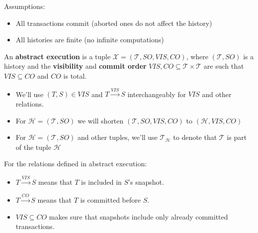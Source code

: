 \documentclass{beamer}
\begin{document}
\begin{frame}
	Assumptions:
	\begin{itemize}
		\item All transactions commit (aborted ones do not affect the history)
		\item All histories are finite (no infinite computations)
	\end{itemize}
\end{frame}

\begin{frame}
	\begin{definition}
		An \textbf{abstract execution} is a tuple $ \mathcal{X} = (\mathcal{T}, SO, VIS, CO) $, where $(\mathcal{T}, SO)$ is a history and the \textbf{visibility} and \textbf{commit order} $ VIS, CO \subseteq \mathcal{T} \times \mathcal{T} $ are such that $ VIS \subseteq CO $ and $CO$ is total.
	\end{definition}
\end{frame}

\begin{frame}
	\begin{itemize}
		\item We'll use $ (T, S) \in VIS$ and $ T \xrightarrow{VIS} S $ interchangeably for $VIS$ and other relations.
		\item For $\mathcal{H}=(\mathcal{T}, SO)$ we will shorten $(\mathcal{T}, SO, VIS, CO)$ to $(\mathcal{H}, VIS, CO)$
		\item For $\mathcal{H}=(\mathcal{T}, SO)$ and other tuples, we'll use $\mathcal{T}_\mathcal{H}$ to denote that $\mathcal{T}$ is part of the tuple $\mathcal{H}$
	\end{itemize}
\end{frame}

\begin{frame}
	For the relations defined in abstract execution:
	\begin{itemize}
		\item $ T \xrightarrow{VIS} S $ means that $T$ is included in $S$'s snapshot.
		\item $ T \xrightarrow{CO} S $ means that $T$ is committed before $S$.
		\item $ VIS \subseteq CO $ makes sure that snapshots include only already committed transactions.
	\end{itemize}
\end{frame}
\end{document}
